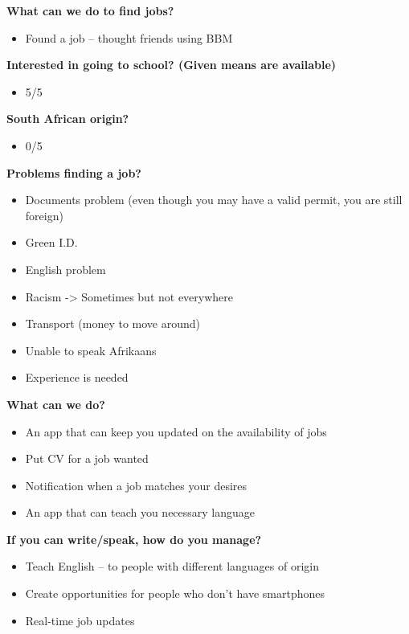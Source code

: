 \noindent\textbf{What can we do to find jobs?}
\begin{itemize}
\item Found a job – thought friends using BBM
\end{itemize}

\noindent\textbf{Interested in going to school? (Given means are available)}
\begin{itemize}
\item 5/5
\end{itemize}

\noindent\textbf{South African origin?}
\begin{itemize}
\item 0/5
\end{itemize}

\noindent\textbf{Problems finding a job?}
\begin{itemize}
\item Documents problem (even though you may have a valid permit, you are still foreign)
\item Green I.D.
\item English problem
\item Racism -> Sometimes but not everywhere
\item Transport (money to move around)
\item Unable to speak Afrikaans
\item Experience is needed
\end{itemize}

\noindent\textbf{What can we do?}
\begin{itemize}
\item An app that can keep you updated on the availability of jobs
\item Put CV for a job wanted
\item Notification when a job matches your desires
\item An app that can teach you necessary language
\end{itemize}

\noindent\textbf{If you can write/speak, how do you manage?}
\begin{itemize}
\item Teach English – to people with different languages of origin
\item Create opportunities for people who don’t have smartphones
\item Real-time job updates
\end{itemize}



